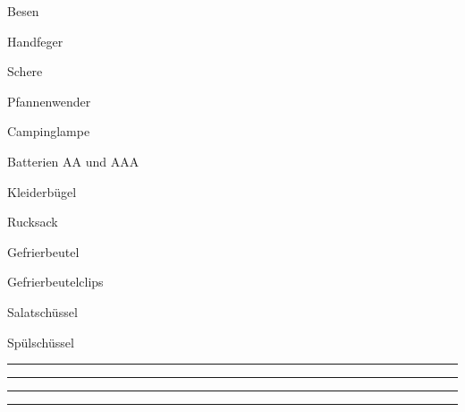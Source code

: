 \begin{ONEitemize}
    \item{Besen}
    \item{Handfeger}
    \item{Schere}
    \item{Pfannenwender}
    \item{Campinglampe}
    \item{Batterien AA und AAA}
    \item{Kleiderbügel}
    \item{Rucksack}
    \item{Gefrierbeutel}
    \item{Gefrierbeutelclips}
    \item{Salatschüssel}
    \item{Spülschüssel}
    \item{\rule{50mm}{0.4pt}}
    \item{\rule{50mm}{0.4pt}}
    \item{\rule{50mm}{0.4pt}}
    \item{\rule{50mm}{0.4pt}}
\end{ONEitemize}
